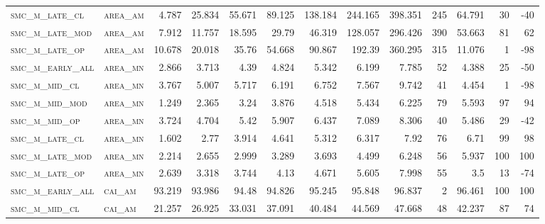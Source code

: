 \begin{landscape}
\begin{center}
\begin{footnotesize}
\begin{longtable}{llrrrrrrrr|rrr}
\textsc{smc\_m\_late\_cl  } & \textsc{area\_am  }   & 4.787    & 25.834   & 55.671   & 89.125   & 138.184  & 244.165  & 398.351  & 245    & 64.791        & 30            & -40             \\
\textsc{smc\_m\_late\_mod } & \textsc{area\_am  }   & 7.912    & 11.757   & 18.595   & 29.79    & 46.319   & 128.057  & 296.426  & 390    & 53.663        & 81            & 62              \\
\textsc{smc\_m\_late\_op  } & \textsc{area\_am  }   & 10.678   & 20.018   & 35.76    & 54.668   & 90.867   & 192.39   & 360.295  & 315    & 11.076        & 1             & -98             \\
\textsc{smc\_m\_early\_all} & \textsc{area\_mn  }   & 2.866    & 3.713    & 4.39     & 4.824    & 5.342    & 6.199    & 7.785    & 52     & 4.388         & 25            & -50             \\
\textsc{smc\_m\_mid\_cl   } & \textsc{area\_mn  }   & 3.767    & 5.007    & 5.717    & 6.191    & 6.752    & 7.567    & 9.742    & 41     & 4.454         & 1             & -98             \\
\textsc{smc\_m\_mid\_mod  } & \textsc{area\_mn  }   & 1.249    & 2.365    & 3.24     & 3.876    & 4.518    & 5.434    & 6.225    & 79     & 5.593         & 97            & 94              \\
\textsc{smc\_m\_mid\_op   } & \textsc{area\_mn  }   & 3.724    & 4.704    & 5.42     & 5.907    & 6.437    & 7.089    & 8.306    & 40     & 5.486         & 29            & -42             \\
\textsc{smc\_m\_late\_cl  } & \textsc{area\_mn  }   & 1.602    & 2.77     & 3.914    & 4.641    & 5.312    & 6.317    & 7.92     & 76     & 6.71          & 99            & 98              \\
\textsc{smc\_m\_late\_mod } & \textsc{area\_mn  }   & 2.214    & 2.655    & 2.999    & 3.289    & 3.693    & 4.499    & 6.248    & 56     & 5.937         & 100           & 100             \\
\textsc{smc\_m\_late\_op  } & \textsc{area\_mn  }   & 2.639    & 3.318    & 3.744    & 4.13     & 4.671    & 5.605    & 7.998    & 55     & 3.5           & 13            & -74             \\
\textsc{smc\_m\_early\_all} & \textsc{cai\_am   }   & 93.219   & 93.986   & 94.48    & 94.826   & 95.245   & 95.848   & 96.837   & 2      & 96.461        & 100           & 100             \\
\textsc{smc\_m\_mid\_cl   } & \textsc{cai\_am   }   & 21.257   & 26.925   & 33.031   & 37.091   & 40.484   & 44.569   & 47.668   & 48     & 42.237        & 87            & 74              \\

\end{longtable}
\end{footnotesize}
\end{center}
\end{landscape}
